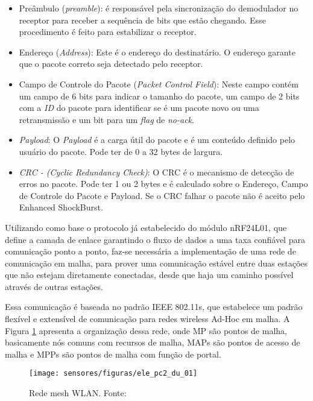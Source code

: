 \begin{itemize}
	\item Preâmbulo (\emph{preamble}): é responsável pela sincronização do demodulador no receptor para receber a sequência de bits que estão chegando. Esse procedimento é feito para estabilizar o receptor.
	\item Endereço (\emph{Address}): Este é o endereço do destinatário. O endereço garante que o pacote correto seja detectado pelo receptor. 
	\item Campo de Controle do Pacote (\emph{Packet Control Field}): Neste campo contém um campo de 6 bits para indicar o tamanho do pacote, um campo de 2 bits com a \emph{ID} do pacote para identificar se é um pacote novo ou uma retransmissão e um bit para um \emph{flag} de \emph{no-ack}.
	\item \emph{Payload}: O \emph{Payload} é a carga útil do pacote e é um conteúdo definido pelo usuário do pacote. Pode ter de 0 a 32 bytes de largura.
	\item \emph{CRC - (Cyclic Redundancy Check)}: O CRC é o mecanismo de detecção de erros no pacote. Pode ter 1 ou 2 bytes e é calculado sobre o Endereço, Campo de Controle do Pacote e Payload. Se o CRC falhar o pacote não é aceito pelo Enhanced ShockBurst\texttrademark.
\end{itemize}

Utilizando como base o protocolo já estabelecido do módulo nRF24L01, que define a camada de enlace garantindo o fluxo de dados a uma taxa confiável para comunicação ponto a ponto, faz-se necessária a implementação de uma rede de comunicação em malha, para prover uma comunicação estável entre duas estações que não estejam diretamente conectadas, desde que haja um caminho possível através de outras estações.

Essa comunicação é baseada no padrão IEEE 802.11s\cite{bib_ele_du_1}, que estabelece um padrão flexível e extensível de comunicação para redes wireless Ad-Hoc em malha\cite{bib_ele_du_5}. A Figura \ref{ele_pc2_du_01} apresenta a organização dessa rede, onde MP são pontos de malha, basicamente nós comuns com recursos de malha, MAPs são pontos de acesso de malha e MPPs são pontos de malha com função de portal.

\begin{figure}
\centering
\texttt{[image: sensores/figuras/ele\_pc2\_du\_01]}
\caption{Rede mesh WLAN. Fonte:\cite{bib_ele_du_2}}
\label{ele_pc2_du_01}
\end{figure}


